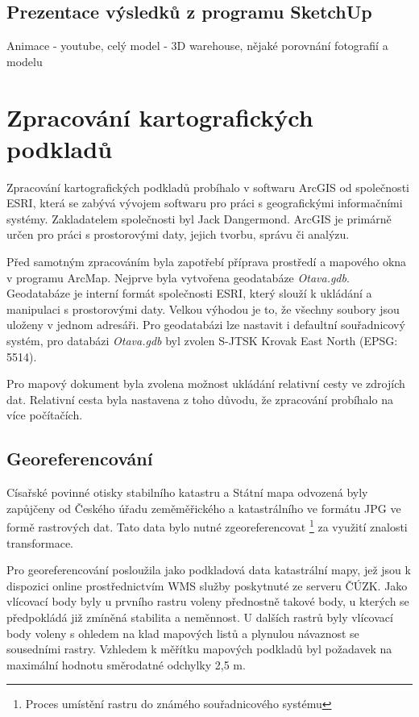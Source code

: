 \documentclass[thesis=M,czech]{FITthesis}[2012/06/26]
\begin{document}
\clearpage

\subsection{Prezentace výsledků z programu SketchUp}
Animace - youtube, celý model - 3D warehouse, nějaké porovnání fotografií a modelu


\section{Zpracování kartografických podkladů}
Zpracování kartografických podkladů probíhalo v softwaru ArcGIS od společnosti ESRI, která se zabývá vývojem softwaru pro práci s geografickými informačními systémy. Zakladatelem společnosti byl Jack Dangermond. ArcGIS je primárně určen pro práci s prostorovými daty, jejich tvorbu, správu či analýzu.

Před samotným zpracováním byla zapotřebí příprava prostředí a mapového okna v programu ArcMap. Nejprve byla vytvořena geodatabáze \textit{Otava.gdb}. Geodatabáze je interní formát společnosti ESRI, který slouží k ukládání a manipulaci s prostorovými daty. Velkou výhodou je to, že všechny soubory jsou uloženy v jednom adresáři. Pro geodatabázi lze nastavit i defaultní souřadnicový systém, pro databázi \textit{Otava.gdb} byl zvolen S-JTSK Krovak East North (EPSG: 5514).

Pro mapový dokument byla zvolena možnost ukládání relativní cesty ve zdrojích dat. Relativní cesta byla nastavena z toho důvodu, že zpracování probíhalo na více počítačích. 


\subsection{Georeferencování}

Císařské povinné otisky stabilního katastru a Státní mapa odvozená byly zapůjčeny od Českého úřadu zeměměřického a katastrálního ve formátu JPG ve formě rastrových dat. Tato data bylo nutné zgeoreferencovat \footnote{Proces umístění rastru do známého souřadnicového systému} za využití znalosti transformace. 

Pro georeferencování posloužila jako podkladová data katastrální mapy, jež jsou k dispozici online prostřednictvím WMS služby poskytnuté ze serveru ČÚZK.  Jako vlícovací body byly u prvního rastru voleny přednostně takové body, u kterých se předpokládá již zmíněná stabilita a neměnnost. U dalších rastrů byly vlícovací body voleny s ohledem na klad mapových listů a plynulou návaznost se sousedními rastry. Vzhledem k měřítku mapových podkladů byl požadavek na maximální hodnotu směrodatné odchylky 2,5 m. 
\end{document}

